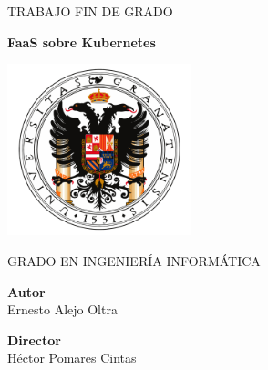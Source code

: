 
\begin{titlepage}
    \begin{center}

        \Large \textsc{TRABAJO FIN DE GRADO}

        \vspace{0.8cm}

        \Huge \textbf{FaaS sobre Kubernetes}

        \vspace{1.5cm}

        \includegraphics[width=0.4\textwidth]{images/ugr.png}

        \vspace{1.5cm}

        \Large GRADO EN INGENIERÍA INFORMÁTICA

        \vspace{1.5cm}

        \normalsize \textbf{Autor} \\ Ernesto Alejo Oltra

        \vspace{0.2cm}

        \normalsize \textbf{Director} \\ Héctor Pomares Cintas

    \end{center}
\end{titlepage}
